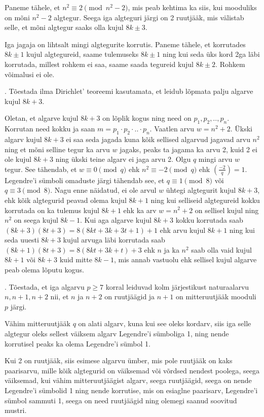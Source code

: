 \documentclass[a4paper, 10pt]{article}
\newcommand{\leg}[2]{\left(\frac{#1}{#2}\right)}
\begin{document}
Paneme tähele, et $n^2\equiv2\pmod{n^2-2}$, mis peab kehtima ka siis, kui mooduliks on mõni $n^2-2$ algtegur. Seega iga algteguri järgi on 2 ruutjääk, mis välistab selle, et mõni algtegur saaks olla kujul $8k\pm3$.

Iga jagaja on lihtsalt mingi algtegurite korrutis. Paneme tähele, et korrutades $8k\pm1$ kujul algtegureid, saame tulemuseks $8k\pm1$ ning kui seda üks kord 2ga läbi korrutada, millest rohkem ei saa, saame saada tegureid kujul $8k\pm2$. Rohkem võimalusi ei ole. 

\bigskip

. Tõestada ilma Dirichlet' teoreemi kasutamata, et leidub lõpmata palju algarve kujul $8k+3$. 

\bigskip
Oletan, et algarve kujul $8k+3$ on lõplik kogus ning need on $p_1,p_2,..,p_n$. Korrutan need kokku ja saan $m=p_1\cdot p_2\cdot..\cdot p_n$. Vaatlen arvu $w=n^2+2$. Ükski algarv kujul $8k+3$ ei saa seda jagada kuna kõik sellised algarvud jagavad arvu $n^2$ ning et mõni selline tegur ka arvu $w$ jagaks, peaks ta jagama ka arvu 2, kuid 2 ei ole kujul $8k+3$ ning ükski teine algarv ei jaga arvu 2. Olgu $q$ mingi arvu $w$ tegur. See tähendab, et $w\equiv0\pmod q$ ehk $n^2\equiv-2\pmod q$ ehk $\leg{-2}{q}=1$. Legendre'i sümboli omaduste järgi tähendab see, et $q\equiv1\pmod 8$ või $q\equiv3\pmod8$. Nagu enne näidatud, ei ole arvul $w$ ühtegi algtegurit kujul $8k+3$, ehk kõik algtegurid peavad olema kujul $8k+1$ ning kui selliseid algtegureid kokku korrutada on ka tulemus kujul $8k+1$ ehk ka arv $w=n^2+2$ on sellisel kujul ning $n^2$ on seega kujul $8k-1$. Kui aga algarve kujul $8k+3$ kokku korrutada saab $(8k+3)(8t+3)=8(8kt+3k+3t+1)+1$ ehk arvu kujul $8k+1$ ning kui seda uuesti $8k+3$ kujul arvuga läbi korrutada saab $(8k+1)(8t+3)=8(8kt+3k+t)+3$ ehk $n$ ja ka $n^2$ saab olla vaid kujul $8k+1$ või $8k+3$ kuid mitte $8k-1$, mis annab vastuolu ehk sellisel kujul algarve peab olema lõputu kogus.
\bigskip

. Tõestada, et iga algarvu $p\geq 7$ korral leiduvad kolm järjestikust naturaalarvu $n,n+1,n+2$ nii, et $n$ ja $n+2$ on ruutjäägid ja $n+1$ on mitteruutjääk mooduli $p$ järgi. 

\bigskip
Vähim mitteruutjääk $q$ on alati algarv, kuna kui see oleks kordarv, siis iga selle algtegur oleks sellest väiksem algarv Legendre'i sümboliga 1, ning nende korrutisel peaks ka olema Legendre'i sümbol 1. 

Kui 2 on ruutjääk, siis esimese algarvu ümber, mis pole ruutjääk on kaks paarisarvu, mille kõik algtegurid on väiksemad või võrdsed nendest poolega, seega väiksemad, kui vähim mitteruutjäägist algarv, seega ruutjäägid, seega on nende Legendre'i sümbolid 1 ning nende korrutise, mis on esiaglne paarisarv, Legendre'i sümbol sammuti 1, seega on need ruutjäägid ning olemegi saanud soovitud mustri. 
\end{document}

